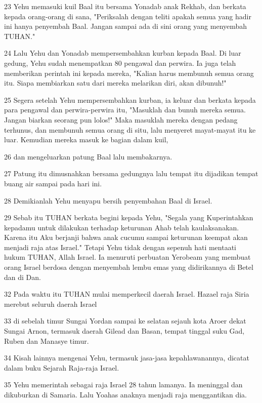 \par 23 Yehu memasuki kuil Baal itu bersama Yonadab anak Rekhab, dan berkata kepada orang-orang di sana, "Periksalah dengan teliti apakah semua yang hadir ini hanya penyembah Baal. Jangan sampai ada di sini orang yang menyembah TUHAN."
\par 24 Lalu Yehu dan Yonadab mempersembahkan kurban kepada Baal. Di luar gedung, Yehu sudah menempatkan 80 pengawal dan perwira. Ia juga telah memberikan perintah ini kepada mereka, "Kalian harus membunuh semua orang itu. Siapa membiarkan satu dari mereka melarikan diri, akan dibunuh!"
\par 25 Segera setelah Yehu mempersembahkan kurban, ia keluar dan berkata kepada para pengawal dan perwira-perwira itu, "Masuklah dan bunuh mereka semua. Jangan biarkan seorang pun lolos!" Maka masuklah mereka dengan pedang terhunus, dan membunuh semua orang di situ, lalu menyeret mayat-mayat itu ke luar. Kemudian mereka masuk ke bagian dalam kuil,
\par 26 dan mengeluarkan patung Baal lalu membakarnya.
\par 27 Patung itu dimusnahkan bersama gedungnya lalu tempat itu dijadikan tempat buang air sampai pada hari ini.
\par 28 Demikianlah Yehu menyapu bersih penyembahan Baal di Israel.
\par 29 Sebab itu TUHAN berkata begini kepada Yehu, "Segala yang Kuperintahkan kepadamu untuk dilakukan terhadap keturunan Ahab telah kaulaksanakan. Karena itu Aku berjanji bahwa anak cucumu sampai keturunan keempat akan menjadi raja atas Israel." Tetapi Yehu tidak dengan sepenuh hati mentaati hukum TUHAN, Allah Israel. Ia menuruti perbuatan Yerobeam yang membuat orang Israel berdosa dengan menyembah lembu emas yang didirikannya di Betel dan di Dan.
\par 32 Pada waktu itu TUHAN mulai memperkecil daerah Israel. Hazael raja Siria merebut seluruh daerah Israel
\par 33 di sebelah timur Sungai Yordan sampai ke selatan sejauh kota Aroer dekat Sungai Arnon, termasuk daerah Gilead dan Basan, tempat tinggal suku Gad, Ruben dan Manasye timur.
\par 34 Kisah lainnya mengenai Yehu, termasuk jasa-jasa kepahlawanannya, dicatat dalam buku Sejarah Raja-raja Israel.
\par 35 Yehu memerintah sebagai raja Israel 28 tahun lamanya. Ia meninggal dan dikuburkan di Samaria. Lalu Yoahas anaknya menjadi raja menggantikan dia.

